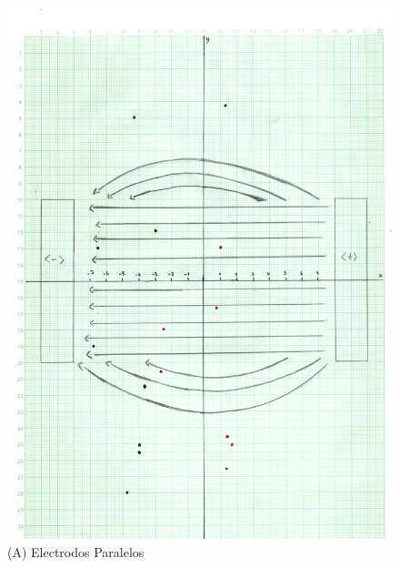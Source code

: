 \documentclass[letterpaper, 12pt]{report}
\begin{document}
\begin{figure}[H]
	\begin{center}
		\includegraphics[scale = 0.6]{./Images/Paralelos.jpg}
		\caption{(A) Electrodos Paralelos}
	\end{center}
\end{figure}
\end{document}

